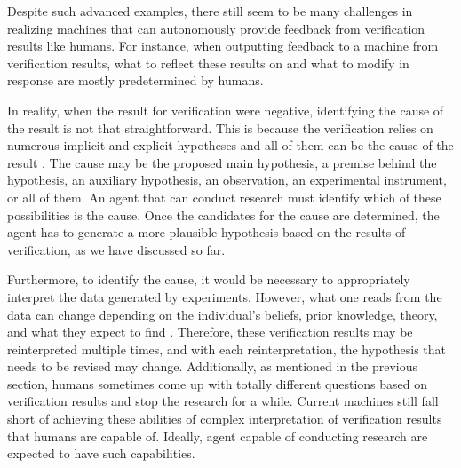 

Despite such advanced examples, there still seem to be many challenges in realizing machines that can autonomously provide feedback from verification results like humans. For instance, when outputting feedback to a machine from verification results, what to reflect these results on and what to modify in response are mostly predetermined by humans. 

In reality, when the result for verification were negative, identifying the cause of the result is not that straightforward. This is because the verification relies on numerous implicit and explicit hypotheses and all of them can be the cause of the result \cite{sep-scientific-underdetermination}. The cause may be the proposed main hypothesis, a premise behind the hypothesis, an auxiliary hypothesis, an observation, an experimental instrument, or all of them. An agent that can conduct research must identify which of these possibilities is the cause. Once the candidates for the cause are determined, the agent has to generate a more plausible hypothesis based on the results of verification, as we have discussed so far.

Furthermore, to identify the cause, it would be necessary to appropriately interpret the data generated by experiments. However, what one reads from the data can change depending on the individual's beliefs, prior knowledge, theory, and what they expect to find \cite{hanson1965patterns}. Therefore, these verification results may be reinterpreted multiple times, and with each reinterpretation, the hypothesis that needs to be revised may change. Additionally, as mentioned in the previous section, humans sometimes come up with totally different questions based on verification results and stop the research for a while. Current machines still fall short of achieving these abilities of complex interpretation of verification results that humans are capable of. Ideally, agent capable of conducting research are expected to have such capabilities.


